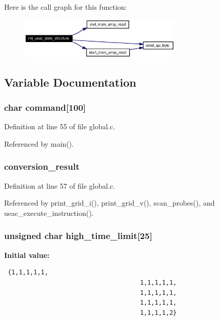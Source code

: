 Here is the call graph for this function:\begin{figure}[H]
\begin{center}
\leavevmode
\includegraphics[width=219pt]{global_8c_a9_cgraph}
\end{center}
\end{figure}


\subsection{Variable Documentation}
\subsubsection{\setlength{\rightskip}{0pt plus 5cm}char {\bf command}[100]}\label{global_8c_a2}




Definition at line 55 of file global.c.

Referenced by main().
\subsubsection{ {\bf conversion\_\-result}}\label{global_8c_a4}




Definition at line 57 of file global.c.

Referenced by print\_\-grid\_\-i(), print\_\-grid\_\-v(), scan\_\-probes(), and ueac\_\-execute\_\-instruction().
\subsubsection{\setlength{\rightskip}{0pt plus 5cm}unsigned char {\bf high\_\-time\_\-limit}[25]}\label{global_8c_a7}


{\bf Initial value:}

\footnotesize\begin{verbatim} {1,1,1,1,1,
                                     1,1,1,1,1,
                                     1,1,1,1,1,
                                     1,1,1,1,1,
                                     1,1,1,1,2}
\end{verbatim}\normalsize 


